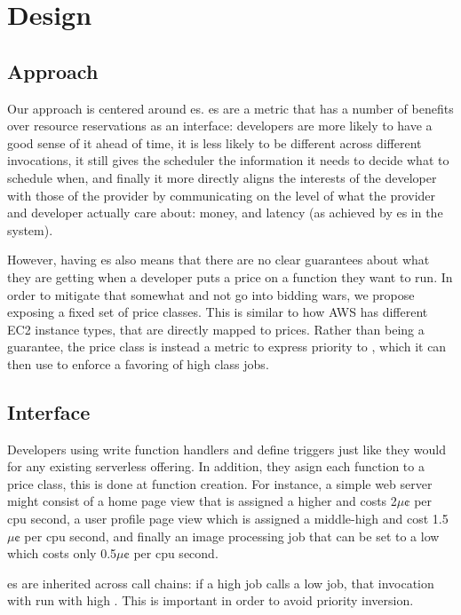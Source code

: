 \section{Design}\label{design}


\subsection{Approach}

Our approach is centered around \priceclass{}es. \Priceclass{}es are a metric
that has a number of benefits over resource reservations as an interface:
developers are more likely to have a good sense of it ahead of time, it is less
likely to be different across different invocations, it still gives the
scheduler the information it needs to decide what to schedule when, and finally
it more directly aligns the interests of the developer with those of the
provider by communicating on the level of what the provider and developer
actually care about: money, and latency (as achieved by \class{}es in the
system).


However, having \priceclass{}es also means that there are no clear guarantees
about what they are getting when a developer puts a price on a function they
want to run. In order to mitigate that somewhat and not go into bidding wars, we
propose exposing a fixed set of price classes. This is similar to how AWS has
different EC2 instance types, that are directly mapped to prices. Rather than
being a guarantee, the price class is instead a metric to express priority to
\sys{}, which it can then use to enforce a favoring of high class jobs.



\subsection{Interface}


Developers using \sys{} write function handlers and define triggers just like
they would for any existing serverless offering. In addition, they asign each
function to a price class, this is done at function creation. For instance, a
simple web server might consist of a home page view that is assigned a higher
\priceclass{} and costs 2$\mu\cent$ per cpu second, a user profile page view
which is assigned a middle-high \class{} and cost 1.5$\mu\cent$ per cpu second,
and finally an image processing job that can be set to a low \class{} which
costs only 0.5$\mu\cent$ per cpu second.

\Class{}es are inherited across call chains: if a high \class{} job calls a low
\class{} job, that invocation with run with high \class{}. This is important in
order to avoid priority inversion.

